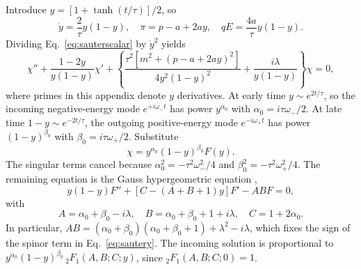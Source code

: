 \documentclass[11pt,a4paper]{article}
\begin{document}
Introduce $y=[1+\tanh(t/\tau)]/2$, so
\begin{equation}
 \dot y=\frac2\tau y(1-y),\quad
 \pi=p-a+2ay,\quad qE=\frac{4a}{\tau}y(1-y).
\end{equation}
Dividing Eq.~\eqref{eq:sauterscalar} by $\dot y^2$ yields
\begin{equation}
 \chi''+\frac{1-2y}{y(1-y)}\chi'
 +\left\{\frac{\tau^2[m^2+(p-a+2ay)^2]}{4y^2(1-y)^2}
          +\frac{i\lambda}{y(1-y)}\right\}\chi=0,
 \label{eq:sautery}
\end{equation}
where primes in this appendix denote $y$ derivatives. At early time $y\sim e^{2t/\tau}$, so the incoming negative-energy mode $e^{+i\omega_-t}$ has power $y^{\alpha_0}$ with $\alpha_0=i\tau\omega_-/2$. At late time $1-y\sim e^{-2t/\tau}$, the outgoing positive-energy mode $e^{-i\omega_+t}$ has power $(1-y)^{\beta_0}$ with $\beta_0=i\tau\omega_+/2$. Substitute
\begin{equation}
 \chi=y^{\alpha_0}(1-y)^{\beta_0}F(y).
\end{equation}
The singular terms cancel because $\alpha_0^2=-\tau^2\omega_-^2/4$ and $\beta_0^2=-\tau^2\omega_+^2/4$. The remaining equation is the Gauss hypergeometric equation \cite[Eq.~15.10.1]{DLMF},
\begin{equation}
 y(1-y)F''+[C-(A+B+1)y]F'-ABF=0,
\end{equation}
with
\begin{equation}
 A=\alpha_0+\beta_0-i\lambda,\quad
 B=\alpha_0+\beta_0+1+i\lambda,\quad C=1+2\alpha_0.
 \label{eq:hyperparameters}
\end{equation}
In particular, $AB=(\alpha_0+\beta_0)(\alpha_0+\beta_0+1)+\lambda^2-i\lambda$, which fixes the sign of the spinor term in Eq.~\eqref{eq:sautery}. The incoming solution is proportional to $y^{\alpha_0}(1-y)^{\beta_0}\,{}_2F_1(A,B;C;y)$, since ${}_2F_1(A,B;C;0)=1$.
\end{document}
